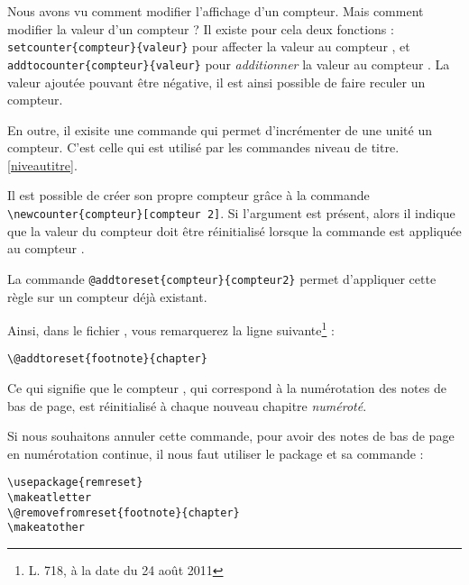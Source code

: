 Nous avons vu comment modifier l'affichage d'un compteur. Mais comment modifier la valeur d'un compteur ? Il existe pour cela deux fonctions : \verb|setcounter{compteur}{valeur}| pour affecter la valeur  au compteur , et \verb|addtocounter{compteur}{valeur}| pour \emph{additionner} la valeur  au compteur . La valeur ajoutée pouvant être négative, il est ainsi possible de faire reculer un compteur.

En outre, il exisite une commande  qui permet d'incrémenter de une unité un compteur. C'est celle qui est utilisé par les commandes niveau de titre.\ref{niveautitre}.



Il est possible de créer son propre compteur grâce à la commande \verb|\newcounter{compteur}[compteur 2]|. Si l'argument  est présent, alors il indique que la valeur du compteur  doit être réinitialisé lorsque la commande  est appliquée au compteur .

La commande  \verb|@addtoreset{compteur}{compteur2}|  permet d'appliquer cette règle sur un compteur déjà existant.

Ainsi, dans le fichier , vous remarquerez la ligne suivante\footnote{L. 718, à la date du 24 août 2011}  :
\begin{verbatim}
\@addtoreset{footnote}{chapter}
\end{verbatim} 

Ce qui signifie que le compteur  , qui correspond à la numérotation des notes de bas de page, est réinitialisé à chaque nouveau chapitre \emph{numéroté}. 

Si nous souhaitons annuler cette commande, pour avoir des notes de bas de page en numérotation continue, il nous faut utiliser le package  et sa commande  :

\begin{verbatim}
\usepackage{remreset}
\makeatletter
\@removefromreset{footnote}{chapter}
\makeatother
\end{verbatim}
